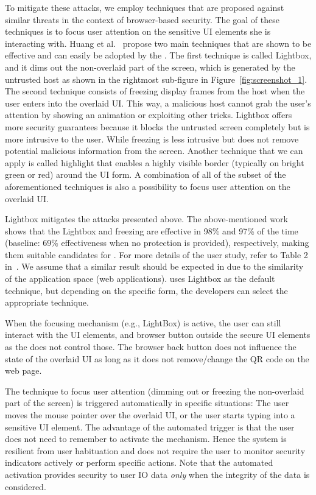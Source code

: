 To mitigate these attacks, we employ techniques that are proposed against similar threats in the context of browser-based security. The goal of these techniques is to focus user attention on the sensitive UI elements she is interacting with. Huang et al.~\cite{huang2012clickjacking} propose two main techniques that are shown to be effective and can easily be adopted by the \device.  The first technique is called Lightbox, and it dims out the non-overlaid part of the screen, which is generated by the untrusted host as shown in the rightmost sub-figure in Figure~\ref{fig:screenshot_1}. The second technique consists of freezing display frames from the host when the user enters into the overlaid UI. This way, a malicious host cannot grab the user's attention by showing an animation or exploiting other tricks.
Lightbox offers more security guarantees because it blocks the untrusted screen completely but is more intrusive to the user. While freezing is less intrusive but does not remove potential malicious information from the screen. Another technique that we can apply is called highlight that enables a highly visible border (typically on bright green or red) around the UI form. A combination of all of the subset of the aforementioned techniques is also a possibility to focus user attention on the overlaid UI.

Lightbox mitigates the attacks presented above. The above-mentioned work~\cite{huang2012clickjacking} shows that the Lightbox and freezing are effective in 98\% and 97\% of the time (baseline: 69\% effectiveness when no protection is provided), respectively, making them suitable candidates for \name. For more details of the user study, refer to Table 2 in~\cite{huang2012clickjacking}. We assume that a similar result should be expected in \name due to the similarity of the application space (web applications). \device uses Lightbox as the default technique, but depending on the specific form, the developers can select the appropriate technique.

When the focusing mechanism (e.g., LightBox) is active, the user can still interact with the UI elements, and browser button outside the secure UI elements as the \device does not control those. The browser back button does not influence the state of the overlaid UI as long as it does not remove/change the QR code on the web page.


 The technique to focus user attention (dimming out or freezing the non-overlaid part of the screen) is triggered automatically in specific situations: The user moves the mouse pointer over the overlaid UI, or the user starts typing into a sensitive UI element. 
The advantage of the automated trigger is that the user does not need to remember to activate the mechanism. Hence the system is resilient from user habituation and does not require the user to monitor security indicators actively or perform specific actions. Note that the automated activation provides security to user IO data \emph{only} when the integrity of the data is considered.

